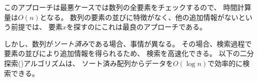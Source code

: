 \begin{comment}
The time complexity of this approach is $O(n)$,
because in the worst case, it is necessary to check
all elements of the array.
If the order of the elements is arbitrary,
this is also the best possible approach, because
there is no additional information available where
in the array we should search for the element $x$.

However, if the array is \emph{sorted},
the situation is different.
In this case it is possible to perform the
search much faster, because the order of the
elements in the array guides the search.
The following \key{binary search} algorithm
efficiently searches for an element in a sorted array
in $O(\log n)$ time.
\end{comment}


このアプローチは最悪ケースでは数列の全要素をチェックするので、
時間計算量は$O(n)$となる。
数列の要素の並びに特徴がなく、他の追加情報がないという前提では、
要素$x$を探すのにこれは最良のアプローチである。

しかし、数列が\emph{ソート済み}である場合、事情が異なる。
その場合、検索過程で要素の並びにより追加情報を得られるため、
検索を高速化できる。
以下の二分探索()アルゴリズムは、
ソート済み配列からデータを$O(\log n)$で効率的に検索できる。


\begin{comment}
\subsubsection{Method 1}

The usual way to implement binary search
resembles looking for a word in a dictionary.
The search maintains an active region in the array,
which initially contains all array elements.
Then, a number of steps is performed,
each of which halves the size of the region.

At each step, the search checks the middle element
of the active region.
If the middle element is the target element,
the search terminates.
Otherwise, the search recursively continues
to the left or right half of the region,
depending on the value of the middle element.

The above idea can be implemented as follows:

\begin{lstlisting}
int a = 0, b = n-1;
while (a <= b) {
    int k = (a+b)/2;
    if (array[k] == x) {
        // x found at index k
    }
    if (array[k] > x) b = k-1;
    else a = k+1;
}
\end{lstlisting}
\end{comment}

